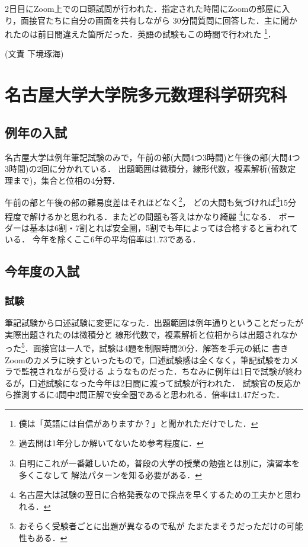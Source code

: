 \documentclass[uplatex]{jsarticle}
\begin{document}
2日目にZoom上での口頭試問が行われた．指定された時間にZoomの部屋に入り，面接官たちに自分の画面を共有しながら
30分間質問に回答した．主に聞かれたのは前日間違えた箇所だった．英語の試験もこの時間で行われた
\footnote{僕は「英語には自信がありますか？」と聞かれただけでした．}．
\begin{flushright}
	(文責 下境琢海)
\end{flushright}

\newpage
\section*{名古屋大学大学院多元数理科学研究科}
	\subsection*{例年の入試}
  名古屋大学は例年筆記試験のみで，午前の部(大問4つ3時間)と午後の部(大問4つ3時間)の2回に分かれている．
  出題範囲は微積分，線形代数，複素解析(留数定理まで)，集合と位相の4分野．
	
  午前の部と午後の部の難易度差はそれほどなく\footnote{過去問は1年分しか解いてないため参考程度に．}，
  どの大問も気づければ\footnote{自明にこれが一番難しいため，普段の大学の授業の勉強とは別に，演習本を多くこなして
  解法パターンを知る必要がある．}15分程度で解けるかと思われる．またどの問題も答えはかなり綺麗
  \footnote{名古屋大は試験の翌日に合格発表なので採点を早くするための工夫かと思われる．}になる．
  ボーダーは基本は6割・7割とれば安全圏，5割でも年によっては合格すると言われている．
  今年を除くここ6年の平均倍率は1.73である．
	\subsection*{今年度の入試} 
	\subsubsection*{試験} 
  筆記試験から口述試験に変更になった．出題範囲は例年通りということだったが実際出題されたのは微積分と
  線形代数で，複素解析と位相からは出題されなかった\footnote{おそらく受験者ごとに出題が異なるので私が
  たまたまそうだっただけの可能性もある．}．面接官は一人で，試験は4題を制限時間20分．解答を手元の紙に
  書きZoomのカメラに映すといったもので，口述試験感は全くなく，筆記試験をカメラで監視されながら受ける
  ようなものだった．ちなみに例年は1日で試験が終わるが，口述試験になった今年は2日間に渡って試験が行われた．
  試験官の反応から推測するに4問中2問正解で安全圏であると思われる．倍率は1.47だった．
\end{document}
